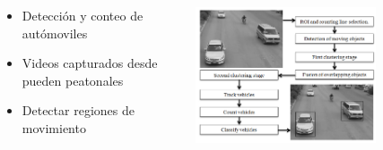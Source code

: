 



\begin{frame}{}
\begin{block}{} 
\begin{columns}
\begin{column}{0.4\textwidth}
		\begin{itemize}
		\item Detección y conteo de autómoviles 
		\item Videos capturados desde pueden peatonales
		\item  Detectar regiones de movimiento 
		\end{itemize}
\end{column}
\begin{column}{0.6\textwidth}  
    \begin{center}
     \includegraphics[width=0.70\textwidth]{Figs/TrafficFlow}
     \end{center}
\end{column}
\end{columns}
\end{block} 
\setcounter{footnote}{0}


\end{frame}

